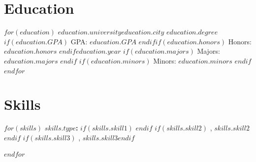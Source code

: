 \documentclass[11pt]{cv-class}
\begin{document}
\section{Education}
$for(education)$
    \noindent\textbf{$education.university$}\hfill{$education.city$}\break
    \textit{$education.degree$}\hfill{$if(education.GPA)$ GPA: {$education.GPA$} $endif$}\hfill{$if(education.honors)$ Honors: \textit{$education.honors$} $endif$}\hfill{$education.year$}\break
    {$if(education.majors)$ Majors: {$education.majors$} $endif$}
    {$if(education.minors)$ \split{} Minors: {$education.minors$} $endif$}
    \bigskip
$endfor$

\section{Skills}
$for(skills)$
    \noindent\textbf{$skills.type$: }$if(skills.skill1)$  $endif$ $if(skills.skill2)$ \unskip, {$skills.skill2$} $endif$ $if(skills.skill3)$ \unskip, {$skills.skill3$}$endif$\hfill\par
$endfor$
\end{document}
